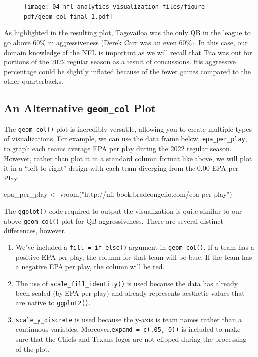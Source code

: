\documentclass[
  letterpaper,
]{krantz}
\newenvironment{Shaded}{\begin{snugshade}}{\end{snugshade}}
\newcommand{\FunctionTok}[1]{\textcolor[rgb]{0.28,0.35,0.67}{#1}}
\newcommand{\NormalTok}[1]{\textcolor[rgb]{0.00,0.23,0.31}{#1}}
\newcommand{\OtherTok}[1]{\textcolor[rgb]{0.00,0.23,0.31}{#1}}
\newcommand{\StringTok}[1]{\textcolor[rgb]{0.13,0.47,0.30}{#1}}
\providecommand{\tightlist}{%
  \setlength{\itemsep}{0pt}\setlength{\parskip}{0pt}}\usepackage{longtable,booktabs,array}
\begin{document}
\begin{figure}[H]

{\centering \texttt{[image: 04-nfl-analytics-visualization\_files/figure-pdf/geom\_col\_final-1.pdf]}

}

\end{figure}

As highlighted in the resulting plot, Tagovailoa was the only QB in the
league to go above 60\% in aggressiveness (Derek Carr was an even 60\%).
In this case, our domain knowledge of the NFL is important as we will
recall that Tua was out for portions of the 2022 regular season as a
result of concussions. His aggressive percentage could be slightly
inflated because of the fewer games compared to the other quarterbacks.

\hypertarget{an-alternative-geom_col-plot}{%
\subsection{\texorpdfstring{An Alternative \texttt{geom\_col}
Plot}{An Alternative geom\_col Plot}}\label{an-alternative-geom_col-plot}}

The \texttt{geom\_col()} plot is incredibly versatile, allowing you to
create multiple types of visualizations. For example, we can use the
data frame below, \texttt{epa\_per\_play}, to graph each teams average
EPA per play during the 2022 regular season. However, rather than plot
it in a standard column format like above, we will plot it in a
``left-to-right'' design with each team diverging from the 0.00 EPA per
Play.

\begin{Shaded}
\begin{Highlighting}[]
\NormalTok{epa\_per\_play }\OtherTok{\textless{}{-}} \FunctionTok{vroom}\NormalTok{(}\StringTok{"http://nfl{-}book.bradcongelio.com/epa{-}per{-}play"}\NormalTok{)}
\end{Highlighting}
\end{Shaded}

The \texttt{ggplot()} code required to output the visualization is quite
similar to our above \texttt{geom\_col()} plot for QB aggressiveness.
There are several distinct differences, however.

\begin{enumerate}
\def\labelenumi{\arabic{enumi}.}
\tightlist
\item
  We've included a \texttt{fill\ =\ if\_else()} argument in
  \texttt{geom\_col()}. If a team has a positive EPA per play, the
  column for that team will be blue. If the team has a negative EPA per
  play, the column will be red.
\item
  The use of \texttt{scale\_fill\_identity()} is used because the data
  has already been scaled (by EPA per play) and already represents
  aesthetic values that are native to \texttt{ggplot2()}.
\item
  \texttt{scale\_y\_discrete} is used because the y-axis is team names
  rather than a continuous variables.
  Moreover,\texttt{expand\ =\ c(.05,\ 0))} is included to make sure that
  the Chiefs and Texans logos are not clipped during the processing of
  the plot.
\end{enumerate}
\end{document}

